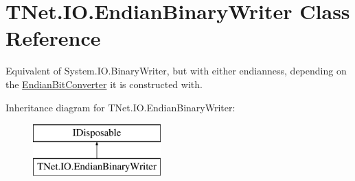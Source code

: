 \hypertarget{class_t_net_1_1_i_o_1_1_endian_binary_writer}{}\section{T\+Net.\+I\+O.\+Endian\+Binary\+Writer Class Reference}
\label{class_t_net_1_1_i_o_1_1_endian_binary_writer}


Equivalent of System.\+I\+O.\+Binary\+Writer, but with either endianness, depending on the \mbox{\hyperlink{class_t_net_1_1_i_o_1_1_endian_bit_converter}{Endian\+Bit\+Converter}} it is constructed with.  


Inheritance diagram for T\+Net.\+I\+O.\+Endian\+Binary\+Writer\+:\begin{figure}[H]
\begin{center}
\leavevmode
\includegraphics[height=2.000000cm]{class_t_net_1_1_i_o_1_1_endian_binary_writer}
\end{center}
\end{figure}
